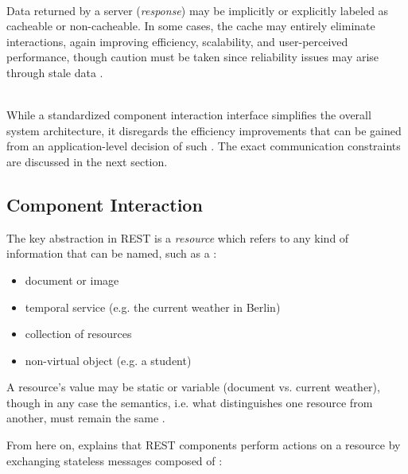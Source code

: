 \begin{appendices}
\begin{description}[format={\storedescriptionlabel}]
\newpage

	\item[Cache]
	\hfill \\
	Data returned by a server (\textit{response}) may be implicitly or explicitly labeled as cacheable or non-cacheable. In some cases, the cache may entirely eliminate interactions, again improving efficiency, scalability, and user-perceived performance, though caution must be taken since reliability issues may arise through stale data \cite[pp.~79--80]{fielding2000architectural}.

	\item[Uniform interface]
	\hfill \\
	While a standardized component interaction interface simplifies the overall system architecture, it disregards the efficiency improvements that can be gained from an application-level decision of such \cite[pp.~81--82]{fielding2000architectural}. The exact communication constraints are discussed in the next section.
\end{description}


\subsection{Component Interaction}
\label{sec:rest-component-interaction}

The key abstraction in \ac{REST} is a \textit{resource} which refers to any kind of information that can be named, such as a \cite[p.~88]{fielding2000architectural}:

\begin{itemize}
  \item document or image
  \item temporal service (e.g. the current weather in Berlin)
  \item collection of resources
  \item non-virtual object (e.g. a student)
\end{itemize}

A resource's value may be static or variable (document vs. current weather), though in any case the semantics, i.e. what distinguishes one resource from another, must remain the same \cite[p.~89]{fielding2000architectural}.

From here on, \citeauthor{fielding2000architectural} explains that \ac{REST} components perform actions on a resource by exchanging stateless messages composed of \cite[pp.~90--91]{fielding2000architectural}:


\end{appendices}
